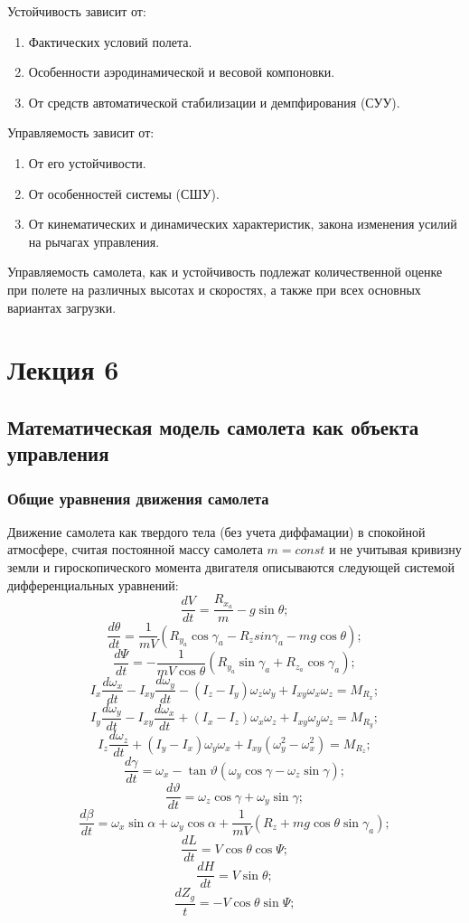 \documentclass{article}
\begin{document}
Устойчивость зависит от:
\begin{enumerate}
\item Фактических условий полета.
\item Особенности аэродинамической и весовой компоновки.
\item От средств автоматической стабилизации и демпфирования (СУУ).
\end{enumerate}
Управляемость зависит от:
\begin{enumerate}
\item От его устойчивости.
\item От особенностей системы (СШУ).
\item От кинематических и динамических характеристик, закона изменения усилий на рычагах управления.
\end{enumerate}

Управляемость самолета, как и устойчивость подлежат количественной оценке при полете на различных высотах и скоростях, а также при всех основных вариантах загрузки.

\newpage
\section{Лекция 6}
\subsection{Математическая модель самолета как объекта управления}
\subsubsection{Общие уравнения движения самолета}
Движение самолета как твердого тела (без учета диффамации) в спокойной атмосфере, считая постоянной массу самолета $m=const$ и не учитывая кривизну земли и гироскопического момента двигателя описываются следующей системой дифференциальных уравнений:
\[
\frac{dV}{dt} = \frac{R_{x_a}}{m} - g \sin{\theta};
\]
\[
\frac{d\theta}{dt} = \frac{1}{mV}(R_{y_a} \cos{\gamma_a} - R_{z} sin{\gamma_a} - mg \cos{\theta});
\]
\[
\frac{d\Psi}{dt} = -\frac{1}{mV \cos{\theta}} (R_{y_a} \sin{\gamma_a} + R_{z_a} \cos{\gamma_a});
\]
\[
I_x \frac{d\omega_x}{dt} - I_{xy} \frac{d\omega_y}{dt} - (I_z - I_y) \omega_z \omega_y + I_{xy} \omega_x \omega_z = M_{R_x};
\]
\[
I_y \frac{d\omega_y}{dt} - I_{xy} \frac{d\omega_x}{dt} + (I_x - I_z) \omega_x \omega_z + I_{xy} \omega_y \omega_z = M_{R_y};
\]
\[
I_z \frac{d\omega_z}{dt} + (I_y - I_x) \omega_y \omega_x + I_{xy}(\omega_y^2 - \omega_x^2) = M_{R_z};
\]
\[
\frac{d\gamma}{dt} = \omega_x - \tan{\vartheta}(\omega_y \cos{\gamma} - \omega_z \sin{\gamma});
\]
\[
\frac{d\vartheta}{dt} = \omega_z \cos{\gamma} + \omega_y \sin{\gamma};
\]
\[
\frac{d\beta}{dt} = \omega_x \sin{\alpha} + \omega_y \cos{\alpha} + \frac{1}{mV}(R_z + mg \cos{\theta} \sin{\gamma_a});
\]
\[
\frac{dL}{dt} = V\cos{\theta} \cos{\Psi};
\]
\[
\frac{dH}{dt} = V\sin{\theta};
\]
\[
\frac{dZ_g}{t} = - V \cos{\theta} \sin{\Psi};
\]
\end{document}
